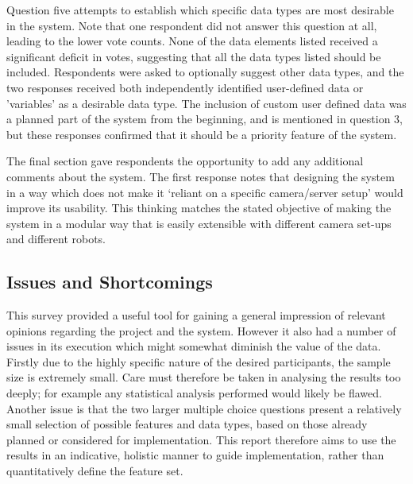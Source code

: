 Question five attempts to establish which specific data types are most desirable in the system. Note that one respondent did not answer this question at all, leading to the lower vote counts. None of the data elements listed received a significant deficit in votes, suggesting that all the data types listed should be included. Respondents were asked to optionally suggest other data types, and the two responses received both independently identified user-defined data or 'variables' as a desirable data  type. The inclusion of custom user defined data was a planned part of the system from the beginning, and is mentioned in question 3, but these responses confirmed that it should be a priority feature of the system.

The final section gave respondents the opportunity to add any additional comments about the system. The first response notes that designing the system in a way which does not make it `reliant on a specific camera/server setup' would improve its usability. This thinking matches the stated objective of making the system in a modular way that is easily extensible with different camera set-ups and different robots.


\subsection{Issues and Shortcomings}
This survey provided a useful tool for gaining a general impression of relevant opinions regarding the project and the system. However it also had a number of issues in its execution which might somewhat diminish the value of the data. Firstly due to the highly specific nature of the desired participants, the sample size is extremely small. Care must therefore be taken in analysing the results too deeply; for example any statistical analysis performed would likely be flawed. Another issue is that the two larger multiple choice questions present a relatively small selection of possible features and data types, based on those already planned or considered for implementation.  This report therefore aims to use the results in an indicative, holistic manner to guide implementation, rather than quantitatively define the feature set.


